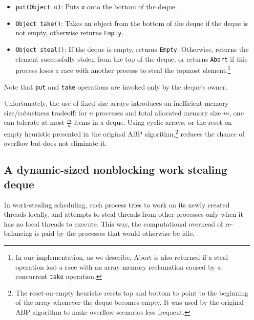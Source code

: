 \begin{itemize}
\item \lstinline!put(Object o)!: Puts \lstinline!o! onto the bottom
  of the deque.
\item \lstinline!Object take()!: Takes an object from the bottom of the
  deque if the deque is not empty, otherwise returns
  \lstinline!Empty!.
\item \lstinline!Object steal()!: If the deque is empty, returns
  \lstinline!Empty!. Otherwise, returns the element successfully
  stolen from the top of the deque, or returns \lstinline!Abort! if
  this process loses a race with another process to steal the topmost
  element.\footnote{In our implementation, as we describe, Abort is
    also returned if a steal operation lost a race with an array
    memory reclamation caused by a concurrent \lstinline!take!
    operation.}
\end{itemize}

Note that \lstinline!put! and \lstinline!take! operations
are invoked only by the deque's owner.

Unfortunately, the use of fixed size arrays introduces an inefficient
memory-size/robustness tradeoff: for $n$ processes and total allocated
memory size $m$, one can tolerate at most $\frac{m}{n}$ items in a
deque. Using cyclic arrays, or the reset-on- empty heuristic presented
in the original ABP algorithm,\footnote{The reset-on-empty heuristic
  resets top and bottom to point to the beginning of the array
  whenever the deque becomes empty. It was used by the original ABP
  algorithm to make overflow scenarios less frequent.} reduces the
chance of overflow but does not eliminate it.

\subsection{A dynamic-sized nonblocking work stealing deque
  \cite{Hendler2006, Hendler2006a}}

In work-stealing scheduling, each process tries to work on its newly
created threads locally, and attempts to steal threads from other
processes only when it has no local threads to execute. This way, the
computational overhead of re-balancing is paid by the processes that
would otherwise be idle.

